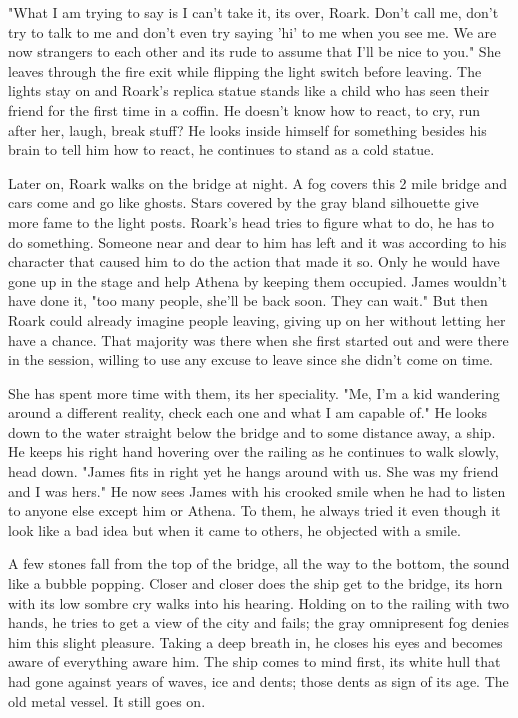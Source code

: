         "What I am trying to say is I can't take it, its over, Roark. Don't call me, don't try to talk to me and don't even try saying 'hi' to
    me when you see me. We are now strangers to each other and its rude to assume that I'll be nice to you." She leaves through the fire exit
    while flipping the light switch before leaving. The lights stay on and Roark's replica statue stands like a child who has seen their friend
    for the first time in a coffin. He doesn't know how to react, to cry, run after her, laugh, break stuff? He looks inside himself for something
    besides his brain to tell him how to react, he continues to stand as a cold statue.

        Later on, Roark walks on the bridge at night. A fog covers this 2 mile bridge and cars come and go like ghosts. Stars covered by the
    gray bland silhouette give more fame to the light posts. Roark's head tries to figure what to do, he has to do something. Someone near
    and dear to him has left and it was according to his character that caused him to do the action that made it so. Only he would have gone
    up in the stage and help Athena by keeping them occupied. James wouldn't have done it, "too many people, she'll be back soon. They can wait."
    But then Roark could already imagine people leaving, giving up on her without letting her have a chance. That majority was there when she
    first started out and were there in the session, willing to use any excuse to leave since she didn't come on time.

        She has spent more time with them, its her speciality. "Me, I'm a kid wandering around a different reality, check each one and what I
    am capable of." He looks down to the water straight below the bridge and to some distance away, a ship. He keeps his right hand hovering over
    the railing as he continues to walk slowly, head down. "James fits in right yet he hangs around with us. She was my friend and I was hers."
    He now sees James with his crooked smile when he had to listen to anyone else except him or Athena. To them, he always tried it even though
    it look like a bad idea but when it came to others, he objected with a smile.

        A few stones fall from the top of the bridge, all the way to the bottom, the sound like a bubble popping. Closer and closer does the 
    ship get to the bridge, its horn with its low sombre cry walks into his hearing. Holding on to the railing with two hands, he tries to get
    a view of the city and fails; the gray omnipresent fog denies him this slight pleasure. Taking a deep breath in, he closes his eyes and
    becomes aware of everything aware him. The ship comes to mind first, its white hull that had gone against years of waves, ice and dents;
    those dents as sign of its age. The old metal vessel. It still goes on.

